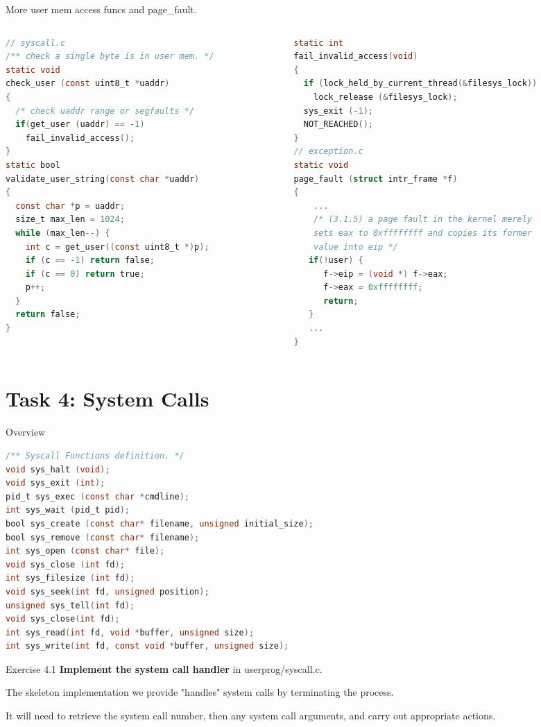 \documentclass[10pt]{beamer}
\begin{document}
\begin{frame}[fragile]{More user mem access funcs and page\_fault.}
\begin{columns}
\begin{column}{0.5\textwidth}
\begin{lstlisting}[language=C]
// syscall.c
/** check a single byte is in user mem. */
static void
check_user (const uint8_t *uaddr) 
{
  /* check uaddr range or segfaults */
  if(get_user (uaddr) == -1)
    fail_invalid_access();
}
static bool 
validate_user_string(const char *uaddr) 
{
  const char *p = uaddr;
  size_t max_len = 1024; 
  while (max_len--) {
    int c = get_user((const uint8_t *)p);
    if (c == -1) return false;
    if (c == 0) return true;
    p++;
  }
  return false;
}
\end{lstlisting}
\end{column}
\begin{column}{0.5\textwidth}
\begin{lstlisting}[language=C]
static int 
fail_invalid_access(void) 
{
  if (lock_held_by_current_thread(&filesys_lock))
    lock_release (&filesys_lock);
  sys_exit (-1);
  NOT_REACHED();
}
// exception.c
static void
page_fault (struct intr_frame *f) 
{
    ...
    /* (3.1.5) a page fault in the kernel merely 
    sets eax to 0xffffffff and copies its former 
    value into eip */
   if(!user) {
      f->eip = (void *) f->eax;
      f->eax = 0xffffffff;
      return;
   }
   ...
}
\end{lstlisting}
\end{column}
\end{columns}
\end{frame}
\section{Task 4: System Calls}
\begin{frame}[fragile]{Overview}
    \begin{lstlisting}[language=C]
/** Syscall Functions definition. */
void sys_halt (void);
void sys_exit (int);
pid_t sys_exec (const char *cmdline);
int sys_wait (pid_t pid);
bool sys_create (const char* filename, unsigned initial_size);
bool sys_remove (const char* filename);
int sys_open (const char* file);
void sys_close (int fd);
int sys_filesize (int fd);
void sys_seek(int fd, unsigned position);
unsigned sys_tell(int fd);
void sys_close(int fd);
int sys_read(int fd, void *buffer, unsigned size);
int sys_write(int fd, const void *buffer, unsigned size);
    \end{lstlisting}
\end{frame}
\begin{frame}[fragile]{Exercise 4.1}
\textbf{Implement the system call handler} in userprog/syscall.c.

The skeleton implementation we provide "handles" system calls by terminating the process.

It will need to retrieve the system call number, then any system call arguments, and carry out appropriate actions.
\end{frame}
\end{document}
